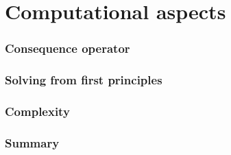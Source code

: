 \part{Computational aspects}
\section{Consequence operator}

\section{Solving from first principles}

\section{Complexity}

\section{Summary}

%
